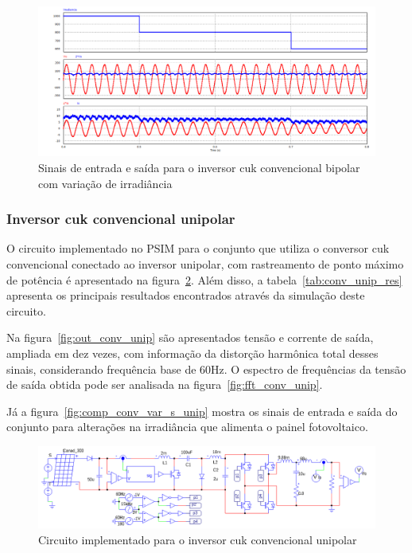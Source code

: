 \documentclass[
	12pt,				%
	openany,
	onseside,
	a4paper,			%
	english,			%
	french,				%
	spanish,			%
	brazil,				%
	]{abntex2}
\begin{document}
\begin{figure}[H]%
	\captionsetup{justification=centering}
	\centering
		\includegraphics[width= \linewidth]{comp_conv_var_s}
		\caption{Sinais de entrada e saída para o inversor cuk convencional bipolar com variação de irradiância}
		\label{fig:comp_conv_var_s_bip}
\end{figure}

\subsubsection{Inversor cuk convencional unipolar}

O circuito implementado no PSIM para o conjunto que utiliza o conversor cuk convencional conectado ao inversor unipolar, com rastreamento de ponto máximo de potência é apresentado na figura~\ref{fig:comp_conv_circ_clean_unip}. Além disso, a tabela~\ref{tab:conv_unip_res} apresenta os principais resultados encontrados através da simulação deste circuito.

Na figura~\ref{fig:out_conv_unip} são apresentados tensão e corrente de saída, ampliada em dez vezes, com informação da distorção harmônica total desses sinais, considerando frequência base de 60Hz. O espectro de frequências da tensão de saída obtida pode ser analisada na figura~\ref{fig:fft_conv_unip}.

Já a figura~\ref{fig:comp_conv_var_s_unip} mostra os sinais de entrada e saída do conjunto para alterações na irradiância que alimenta o painel fotovoltaico.

\begin{figure}[H]%
	\captionsetup{justification=centering}
	\centering
		\includegraphics[width= \linewidth]{comp_conv_circ_clean_unip}
		\caption{Circuito implementado para o inversor cuk convencional unipolar}
		\label{fig:comp_conv_circ_clean_unip}
\end{figure}
\end{document}
